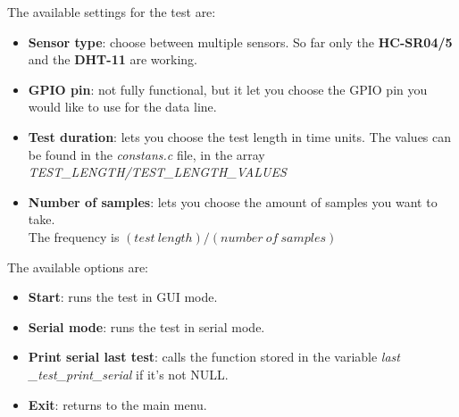\documentclass[14pt]{article}
\begin{document}
\begin{normalsize}
		\noindent The available settings for the test are:
		\begin{itemize}
			\item \textbf{Sensor type}: choose between multiple sensors. So far only the \textbf{HC-SR04/5} and the \textbf{DHT-11} are working.
			\item \textbf{GPIO pin}: not fully functional, but it let you choose the GPIO pin you would like to use for the data line.
			\item \textbf{Test duration}: lets you choose the test length in time units. The values can be found in the \textit{constans.c} file, in the array \textit{TEST\_LENGTH/TEST\_LENGTH\_VALUES}
			\item \textbf{Number of samples}: lets you choose the amount of samples you want to take.\\
			The frequency is $(test\ length) / (number\ of\ samples)$
		\end{itemize}
		\noindent The available options are:
		\begin{itemize}
			\item \textbf{Start}: runs the test in GUI mode.
			\item \textbf{Serial mode}: runs the test in serial mode.
			\item \textbf{Print serial last test}: calls the function stored in the variable \textit{last \_test\_print\_serial} if it's not NULL.
			\item \textbf{Exit}: returns to the main menu.
		\end{itemize}
		
		
		
		
	\end{normalsize}
	
	
	
	\newpage
\end{document}
